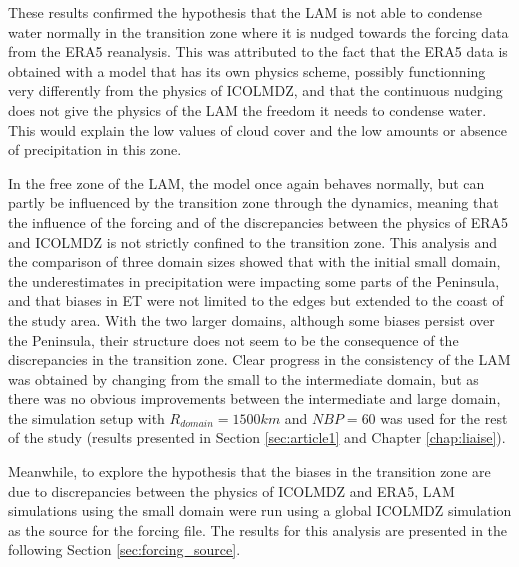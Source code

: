 \begin{figure}[htbp]
\begin{tabular}{ccc}
    \end{tabular}
    \caption{}
    \label{fig:domain_size_clouds_ERA_diff_maps}
\end{figure}


These results confirmed the hypothesis that the LAM is not able to condense water normally in the transition zone where it is nudged towards the forcing data from the ERA5 reanalysis. This was attributed to the fact that the ERA5 data is obtained with a model that has its own physics scheme, possibly functionning very differently from the physics of ICOLMDZ, and that the continuous nudging does not give the physics of the LAM the freedom it needs to condense water. This would explain the low values of cloud cover and the low amounts or absence of precipitation in this zone.

In the free zone of the LAM, the model once again behaves normally, but can partly be influenced by the transition zone through the dynamics, meaning that the influence of the forcing and of the discrepancies between the physics of ERA5 and ICOLMDZ is not strictly confined to the transition zone.
This analysis and the comparison of three domain sizes showed that with the initial small domain, the underestimates in precipitation were impacting some parts of the Peninsula, and that biases in ET were not limited to the edges but extended to the coast of the study area. With the two larger domains, although some biases persist over the Peninsula, their structure does not seem to be the consequence of the discrepancies in the transition zone. Clear progress in the consistency of the LAM was obtained by changing from the small to the intermediate domain, but as there was no obvious improvements between the intermediate and large domain, the simulation setup with $R_{domain} = 1500 km$ and $NBP = 60$ was used for the rest of the study (results presented in Section \ref{sec:article1} and Chapter \ref{chap:liaise}).

Meanwhile,  to explore the hypothesis that the biases in the transition zone are due to discrepancies between the physics of ICOLMDZ and ERA5, LAM simulations using the small domain were run using a global ICOLMDZ simulation as the source for the forcing file. The results for this analysis are presented in the following Section \ref{sec:forcing_source}.

\clearpage

